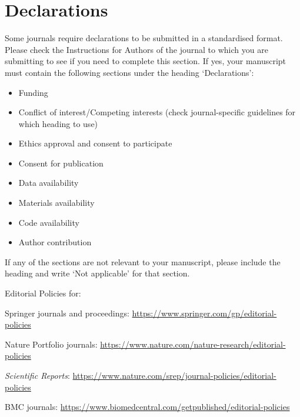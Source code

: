 \documentclass[pdflatex,sn-mathphys-num]{sn-jnl}%
\theoremstyle{thmstyleone}%
\theoremstyle{thmstyletwo}%
\theoremstyle{thmstylethree}%
\begin{document}
\section*{Declarations}

Some journals require declarations to be submitted in a standardised format. Please check the Instructions for Authors of the journal to which you are submitting to see if you need to complete this section. If yes, your manuscript must contain the following sections under the heading `Declarations':

\begin{itemize}
\item Funding
\item Conflict of interest/Competing interests (check journal-specific guidelines for which heading to use)
\item Ethics approval and consent to participate
\item Consent for publication
\item Data availability 
\item Materials availability
\item Code availability 
\item Author contribution
\end{itemize}

\noindent
If any of the sections are not relevant to your manuscript, please include the heading and write `Not applicable' for that section. 

\bigskip
\begin{flushleft}%
Editorial Policies for:

\bigskip\noindent
Springer journals and proceedings: \url{https://www.springer.com/gp/editorial-policies}

\bigskip\noindent
Nature Portfolio journals: \url{https://www.nature.com/nature-research/editorial-policies}

\bigskip\noindent
\textit{Scientific Reports}: \url{https://www.nature.com/srep/journal-policies/editorial-policies}

\bigskip\noindent
BMC journals: \url{https://www.biomedcentral.com/getpublished/editorial-policies}
\end{flushleft}
\end{document}

